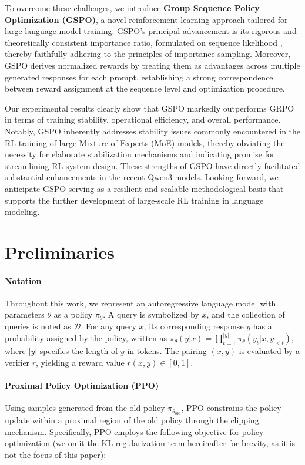 To overcome these challenges, we introduce \textbf{Group Sequence Policy Optimization (GSPO)}, a novel reinforcement learning approach tailored for large language model training. GSPO's principal advancement is its rigorous and theoretically consistent importance ratio, formulated on sequence likelihood \citep{click}, thereby faithfully adhering to the principles of importance sampling. Moreover, GSPO derives normalized rewards by treating them as advantages across multiple generated responses for each prompt, establishing a strong correspondence between reward assignment at the sequence level and optimization procedure.

Our experimental results clearly show that GSPO markedly outperforms GRPO in terms of training stability, operational efficiency, and overall performance. Notably, GSPO inherently addresses stability issues commonly encountered in the RL training of large Mixture-of-Experts (MoE) models, thereby obviating the necessity for elaborate stabilization mechanisms and indicating promise for streamlining RL system design. These strengths of GSPO have directly facilitated substantial enhancements in the recent Qwen3 models. Looking forward, we anticipate GSPO serving as a resilient and scalable methodological basis that supports the further development of large-scale RL training in language modeling.

\section{Preliminaries}

\paragraph{Notation}
Throughout this work, we represent an autoregressive language model with parameters $\theta$ as a policy $\pi_\theta$. A query is symbolized by $x$, and the collection of queries is noted as $\mathcal{D}$. For any query $x$, its corresponding response $y$ has a probability assigned by the policy, written as $\pi_\theta(y | x)=\prod_{t=1}^{|y|} \pi_\theta (y_t | x, y_{<t} )$, where $|y|$ specifies the length of $y$ in tokens. The pairing $(x, y)$ is evaluated by a verifier $r$, yielding a reward value $r(x, y) \in [0, 1]$.

\paragraph{Proximal Policy Optimization (PPO)} Using samples generated from the old policy $\pi_{\theta_\text{old}}$, PPO \citep{ppo} constrains the policy update within a proximal region of the old policy through the clipping mechanism. Specifically, PPO employs the following objective for policy optimization (we omit the KL regularization term hereinafter for brevity, as it is not the focus of this paper):

